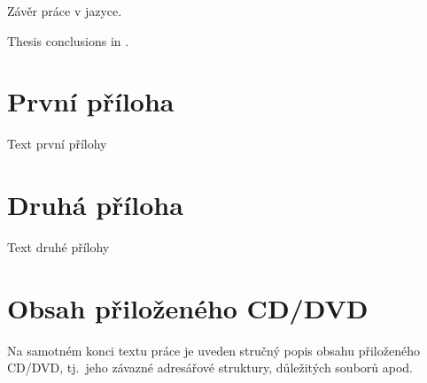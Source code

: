 \documentclass[
  biblatex=false,
  font=serif,
  glossaries=false,
  tables=false,
  theorems=false,
  index
]{kidiplom}
\begin{document}
\begin{kiconclusions}
Závěr práce v  jazyce.
\end{kiconclusions}

\begin{kiconclusions}[english]
Thesis conclusions in .
\end{kiconclusions}

\appendix

\section{První příloha}
Text první přílohy

\section{Druhá příloha}
Text druhé přílohy

\section{Obsah přiloženého CD/DVD} \label{sec:ObsahCD}

Na samotném konci textu práce je uveden stručný popis obsahu
přiloženého CD/DVD, tj.~jeho závazné adresářové struktury, důležitých
souborů apod.
\end{document}
